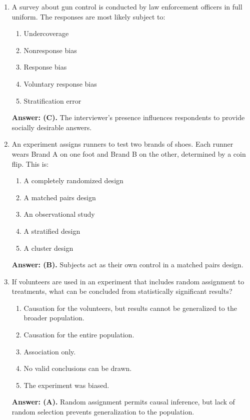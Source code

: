 \begin{enumerate}[leftmargin=1.5em]
  \item A survey about gun control is conducted by law enforcement officers in full uniform. The responses are most likely subject to:
  \begin{enumerate}[label=(\Alph*)]
    \item Undercoverage \item Nonresponse bias \item Response bias \item Voluntary response bias \item Stratification error
  \end{enumerate}
  \textbf{Answer: (C).} The interviewer's presence influences respondents to provide socially desirable answers.

  \item An experiment assigns runners to test two brands of shoes. Each runner wears Brand A on one foot and Brand B on the other, determined by a coin flip. This is:
  \begin{enumerate}[label=(\Alph*)]
    \item A completely randomized design \item A matched pairs design \item An observational study \item A stratified design \item A cluster design
  \end{enumerate}
  \textbf{Answer: (B).} Subjects act as their own control in a matched pairs design.

  \item If volunteers are used in an experiment that includes random assignment to treatments, what can be concluded from statistically significant results?
  \begin{enumerate}[label=(\Alph*)]
    \item Causation for the volunteers, but results cannot be generalized to the broader population.
    \item Causation for the entire population.
    \item Association only.
    \item No valid conclusions can be drawn.
    \item The experiment was biased.
  \end{enumerate}
  \textbf{Answer: (A).} Random assignment permits causal inference, but lack of random selection prevents generalization to the population.
\end{enumerate}

